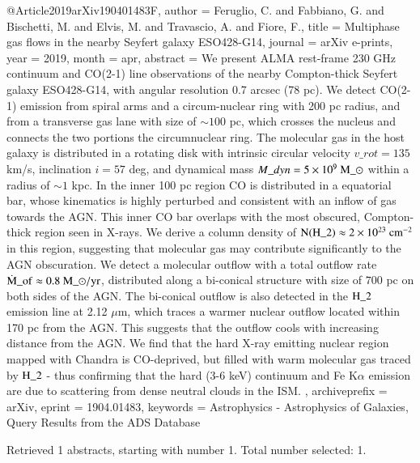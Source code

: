 \documentclass[longauth]{aa}
\begin{document}
{{{{{{{{{{@Article{2019arXiv190401483F,
  author        = {Feruglio, C. and Fabbiano, G. and Bischetti, M. and Elvis, M. and Travascio, A. and Fiore, F.},
  title         = {Multiphase gas flows in the nearby Seyfert galaxy ESO428-G14},
  journal       = {arXiv e-prints},
  year          = {2019},
  month         = apr,
  abstract      = {We present ALMA rest-frame 230 GHz continuum and CO(2-1) line
observations of the nearby Compton-thick Seyfert galaxy ESO428-G14, with
angular resolution 0.7 arcsec (78 pc). We detect CO(2-1) emission from
spiral arms and a circum-nuclear ring with 200 pc radius, and from a
transverse gas lane with size of $\sim100$ pc, which crosses the nucleus
and connects the two portions the circumnuclear ring. The molecular gas
in the host galaxy is distributed in a rotating disk with intrinsic
circular velocity $v\_{rot}=135$ km/s, inclination $i=57$ deg, and
dynamical mass $M\_{dyn }=5\times 10^9~\rm M\_{\odot}$ within a radius of
$\sim 1$ kpc. In the inner 100 pc region CO is distributed in a
equatorial bar, whose kinematics is highly perturbed and consistent with
an inflow of gas towards the AGN. This inner CO bar overlaps with the
most obscured, Compton-thick region seen in X-rays. We derive a column
density of $\rm N(H\_2) \approx 2\times10^{23}~ cm^{-2}$ in this region,
suggesting that molecular gas may contribute significantly to the AGN
obscuration. We detect a molecular outflow with a total outflow rate
$\rm \dot M\_{of}\approx 0.8~M\_{\odot}/yr$, distributed along a
bi-conical structure with size of $700$ pc on both sides of the AGN. The
bi-conical outflow is also detected in the $\rm H\_2$ emission line at
2.12 $\mu$m, which traces a warmer nuclear outflow located within 170 pc
from the AGN. This suggests that the outflow cools with increasing
distance from the AGN. We find that the hard X-ray emitting nuclear
region mapped with Chandra is CO-deprived, but filled with warm
molecular gas traced by $\rm H\_2$ - thus confirming that the hard (3-6
keV) continuum and Fe K$\alpha$ emission are due to scattering from
dense neutral clouds in the ISM.
},
  archiveprefix = {arXiv},
  eprint        = {1904.01483},
  keywords      = {Astrophysics - Astrophysics of Galaxies},
}
Query Results from the ADS Database


Retrieved 1 abstracts, starting with number 1.  Total number selected: 1.

}}}}}}}}}}
\end{document}

